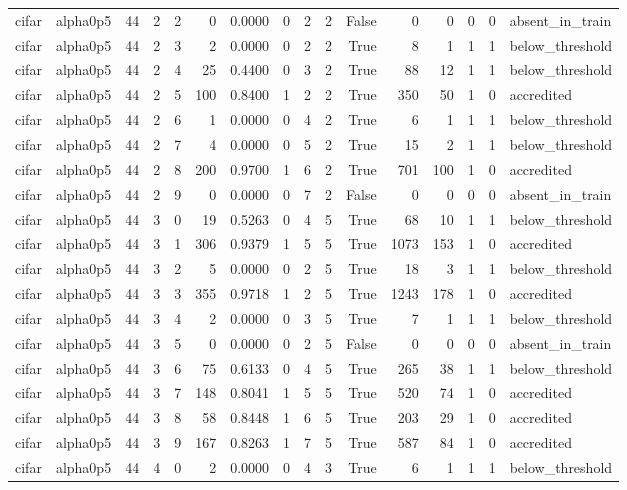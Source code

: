 \begin{tabular}{llrrrrrrrrrrrrrl}
cifar & alpha0p5 & 44 & 2 & 2 & 0 & 0.0000 & 0 & 2 & 2 & False & 0 & 0 & 0 & 0 & absent\_in\_train \\
cifar & alpha0p5 & 44 & 2 & 3 & 2 & 0.0000 & 0 & 2 & 2 & True & 8 & 1 & 1 & 1 & below\_threshold \\
cifar & alpha0p5 & 44 & 2 & 4 & 25 & 0.4400 & 0 & 3 & 2 & True & 88 & 12 & 1 & 1 & below\_threshold \\
cifar & alpha0p5 & 44 & 2 & 5 & 100 & 0.8400 & 1 & 2 & 2 & True & 350 & 50 & 1 & 0 & accredited \\
cifar & alpha0p5 & 44 & 2 & 6 & 1 & 0.0000 & 0 & 4 & 2 & True & 6 & 1 & 1 & 1 & below\_threshold \\
cifar & alpha0p5 & 44 & 2 & 7 & 4 & 0.0000 & 0 & 5 & 2 & True & 15 & 2 & 1 & 1 & below\_threshold \\
cifar & alpha0p5 & 44 & 2 & 8 & 200 & 0.9700 & 1 & 6 & 2 & True & 701 & 100 & 1 & 0 & accredited \\
cifar & alpha0p5 & 44 & 2 & 9 & 0 & 0.0000 & 0 & 7 & 2 & False & 0 & 0 & 0 & 0 & absent\_in\_train \\
cifar & alpha0p5 & 44 & 3 & 0 & 19 & 0.5263 & 0 & 4 & 5 & True & 68 & 10 & 1 & 1 & below\_threshold \\
cifar & alpha0p5 & 44 & 3 & 1 & 306 & 0.9379 & 1 & 5 & 5 & True & 1073 & 153 & 1 & 0 & accredited \\
cifar & alpha0p5 & 44 & 3 & 2 & 5 & 0.0000 & 0 & 2 & 5 & True & 18 & 3 & 1 & 1 & below\_threshold \\
cifar & alpha0p5 & 44 & 3 & 3 & 355 & 0.9718 & 1 & 2 & 5 & True & 1243 & 178 & 1 & 0 & accredited \\
cifar & alpha0p5 & 44 & 3 & 4 & 2 & 0.0000 & 0 & 3 & 5 & True & 7 & 1 & 1 & 1 & below\_threshold \\
cifar & alpha0p5 & 44 & 3 & 5 & 0 & 0.0000 & 0 & 2 & 5 & False & 0 & 0 & 0 & 0 & absent\_in\_train \\
cifar & alpha0p5 & 44 & 3 & 6 & 75 & 0.6133 & 0 & 4 & 5 & True & 265 & 38 & 1 & 1 & below\_threshold \\
cifar & alpha0p5 & 44 & 3 & 7 & 148 & 0.8041 & 1 & 5 & 5 & True & 520 & 74 & 1 & 0 & accredited \\
cifar & alpha0p5 & 44 & 3 & 8 & 58 & 0.8448 & 1 & 6 & 5 & True & 203 & 29 & 1 & 0 & accredited \\
cifar & alpha0p5 & 44 & 3 & 9 & 167 & 0.8263 & 1 & 7 & 5 & True & 587 & 84 & 1 & 0 & accredited \\
cifar & alpha0p5 & 44 & 4 & 0 & 2 & 0.0000 & 0 & 4 & 3 & True & 6 & 1 & 1 & 1 & below\_threshold \\

\end{tabular}
